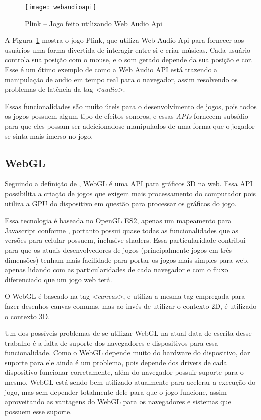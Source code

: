 \begin{figure}[H]
  \centering
	\texttt{[image: webaudioapi]}
  \caption{Plink {--} Jogo feito utilizando Web Audio Api}
  \label{img:webaudioapi}
\end{figure}

A Figura~\ref{img:webaudioapi} mostra o jogo Plink, que utiliza Web
Audio Api para fornecer aos usuários uma forma divertida de interagir
entre si e criar músicas. Cada usuário controla sua posição com o
mouse, e o som gerado depende da sua posição e cor. Esse é um ótimo
exemplo de como a Web Audio API está trazendo a manipulação de audio
em tempo real para o navegador, assim resolvendo os problemas de
latência da tag \textit{<audio>}.

Essas funcionalidades são muito úteis para o desenvolvimento de jogos, pois
todos os jogos possuem algum tipo de efeitos sonoros, e essas
\textit{APIs} fornecem subsídio para que eles possam ser adcicionadose
manipulados de uma forma que o jogador se sinta mais imerso no jogo.

\subsection{WebGL}

Seguindo a definição de , WebGL é uma API para gráficos 3D na web. Essa
API possibilita a criação de jogos que exigem mais processamento do
computador pois utiliza a GPU do dispositivo em questão para processar
os gráficos do jogo.

Essa tecnologia é baseada no OpenGL ES2, apenas um mapeamento para
Javascript conforme , portanto possui
quase todas as funcionalidades que as versões para celular possuem,
inclusive shaders. Essa particularidade contribui
para que os atuais desenvolvedores de jogos (principalmente jogos em
três dimensões) tenham mais facilidade para portar os jogos mais
simples para web, apenas lidando com as particularidades de cada
navegador e com o fluxo diferenciado que um jogo web terá.

O WebGL é baseado na tag \textit{<canvas>}, e utiliza a mesma tag
empregada para fazer desenhos canvas comums, mas ao invés de utilizar o contexto
2D, é utilizado o contexto 3D.

Um dos possíveis problemas de se utilizar WebGL na atual data
de escrita desse trabalho é a falta de suporte dos navegadores e
dispositivos para essa funcionalidade. Como o WebGL depende muito do
hardware do dispositivo, dar suporte para ele ainda é um problema,
pois depende dos drivers de cada dispositivo funcionar
corretamente, além do navegador possuir suporte para o mesmo.
WebGL está sendo bem utilizado atualmente para acelerar a execução do jogo,
mas sem depender totalmente dele para que o jogo funcione, assim
aproveitando as vantagens do WebGL para os navegadores e sistemas que
possuem esse suporte.

